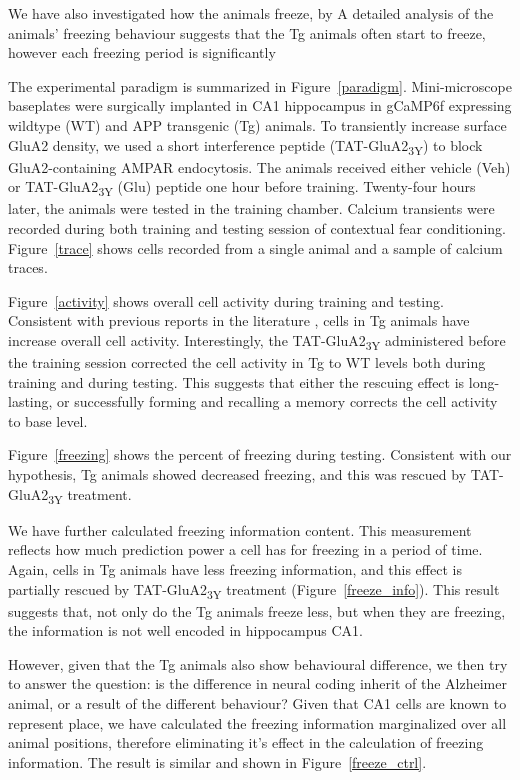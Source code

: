 We have also investigated how the animals freeze, by A detailed analysis of the animals' freezing behaviour suggests that the Tg animals often start to freeze, however each freezing period is significantly 


The experimental paradigm is summarized in Figure~\ref{paradigm}. Mini-microscope baseplates were surgically implanted in CA1 hippocampus in gCaMP6f expressing wildtype (WT) and APP transgenic (Tg) animals. To transiently increase surface GluA2 density, we used a short interference peptide (TAT-GluA2\textsubscript{3Y}) to block GluA2-containing AMPAR endocytosis. The animals received either vehicle (Veh) or TAT-GluA2\textsubscript{3Y} (Glu) peptide one hour before training. Twenty-four hours later, the animals were tested in the training chamber. Calcium transients were recorded during both training and testing session of contextual fear conditioning. Figure~\ref{trace} shows cells recorded from a single animal and a sample of calcium traces. 


Figure~\ref{activity} shows overall cell activity during training and testing. Consistent with previous reports in the literature \citep{verret12}, cells in Tg animals have increase overall cell activity. Interestingly, the TAT-GluA2\textsubscript{3Y} administered before the training session corrected the cell activity in Tg to WT levels both during training and during testing. This suggests that either the rescuing effect is long-lasting, or successfully forming and recalling a memory corrects the cell activity to base level.

Figure~\ref{freezing} shows the percent of freezing during testing. Consistent with our hypothesis, Tg animals showed decreased freezing, and this was rescued by TAT-GluA2\textsubscript{3Y} treatment. 

We have further calculated freezing information content. This measurement reflects how much prediction power a cell has for freezing in a period of time. Again, cells in Tg animals have less freezing information, and this effect is partially rescued by TAT-GluA2\textsubscript{3Y} treatment (Figure~\ref{freeze_info}). This result suggests that, not only do the Tg animals freeze less, but when they are freezing, the information is not well encoded in hippocampus CA1. 

However, given that the Tg animals also show behavioural difference, we then try to answer the question: is the difference in neural coding inherit of the Alzheimer animal, or a result of the different behaviour? Given that CA1 cells are known to represent place, we have calculated the freezing information marginalized over all animal positions, therefore eliminating it's effect in the calculation of freezing information. The result is similar and shown in Figure~\ref{freeze_ctrl}. 

